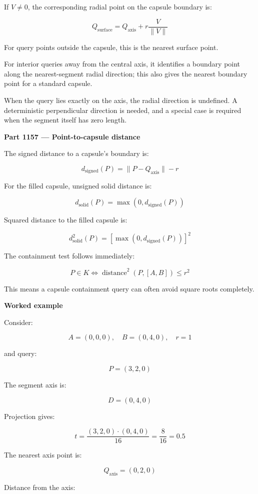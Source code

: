 If \(V\ne0\), the corresponding radial point on the capsule boundary is:

\[
\boxed{ Q_{\mathrm{surface}} = Q_{\mathrm{axis}} + r\frac{V}{\|V\|} }
\]

For query points outside the capsule, this is the nearest surface point.

For interior queries away from the central axis, it identifies a boundary point along the nearest-segment radial direction; this also gives the nearest boundary point for a standard capsule.

When the query lies exactly on the axis, the radial direction is undefined. A deterministic perpendicular direction is needed, and a special case is required when the segment itself has zero length.

\textbf{Part 1157 --- Point-to-capsule distance}

The signed distance to a capsule's boundary is:

\[
\boxed{ d_{\mathrm{signed}}(P)= \|P-Q_{\mathrm{axis}}\|-r }
\]

For the filled capsule, unsigned solid distance is:

\[
\boxed{ d_{\mathrm{solid}}(P)= \max(0,d_{\mathrm{signed}}(P)) }
\]

Squared distance to the filled capsule is:

\[
\boxed{ d_{\mathrm{solid}}^2(P)= \left[\max(0,d_{\mathrm{signed}}(P))\right]^2 }
\]

The containment test follows immediately:

\[
\boxed{ P\in K \iff \operatorname{distance}^2(P,[A,B])\le r^2 }
\]

This means a capsule containment query can often avoid square roots completely.

\textbf{Worked example}

Consider:

\[
A=(0,0,0),\quad B=(0,4,0),\quad r=1
\]

and query:

\[
P=(3,2,0)
\]

The segment axis is:

\[
D=(0,4,0)
\]

Projection gives:

\[
t=\frac{(3,2,0)\cdot(0,4,0)}{16} =\frac{8}{16}=0.5
\]

The nearest axis point is:

\[
Q_{\mathrm{axis}}=(0,2,0)
\]

Distance from the axis:

